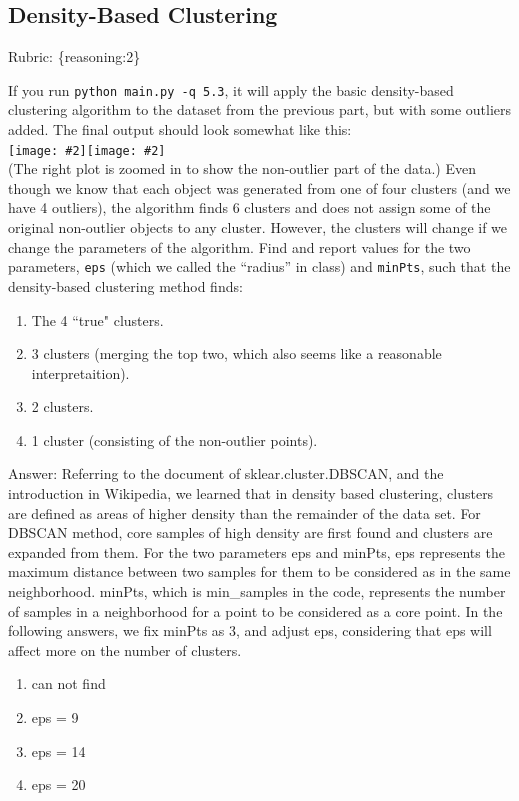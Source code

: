 \documentclass{article}
\def\rubric#1{\gre{Rubric: \{#1\}}}{}
\def\blu#1{{\color{blu}#1}}
\def\gre#1{{\color{gre}#1}}
\newcommand{\fig}[2]{\texttt{[image: \#2]}}
\def\enum#1{\begin{enumerate}#1\end{enumerate}}
\begin{document}
\subsection{Density-Based Clustering}
\rubric{reasoning:2}

If you run \texttt{python main.py -q 5.3},
it will apply the basic density-based clustering algorithm to the dataset from the previous part, but with some outliers added.
The final output should look somewhat like this:\\
\fig{.49}{../figs/density}\fig{.49}{../figs/density2}\\
(The right plot is zoomed in to show the non-outlier part of the data.)
Even though we know that each object was generated from one of four clusters (and we have 4 outliers),
 the algorithm finds 6 clusters and does not assign some of the original non-outlier
  objects to any cluster. However, the clusters will change if we change the parameters
  of the algorithm. Find and report values for the two
  parameters, \texttt{eps} (which we called the ``radius'' in class) and \texttt{minPts},
   such that the density-based clustering method finds:
\blu{\enum{
\item The 4 ``true" clusters.
\item 3 clusters (merging the top two, which also seems like a reasonable interpretaition).
\item 2 clusters.
\item 1 cluster (consisting of the non-outlier points).
}
}
\gre{ Answer:
Referring to the document of sklear.cluster.DBSCAN, and the introduction in Wikipedia, we learned that in density based clustering, clusters are defined as areas of higher density than the remainder of the data set.
For DBSCAN method, core samples of high density are first found and clusters are expanded from them.
For the two parameters eps and minPts, eps represents the maximum distance between two samples for them to be considered as in the same neighborhood.
minPts, which is min\_samples in the code, represents the number of samples in a neighborhood for a point to be considered as a core point.
In the following answers, we fix minPts as 3, and adjust eps, considering that eps will affect more on the number of clusters.
\begin{enumerate}
    \item can not find
    \item eps = 9
    \item eps = 14
    \item eps = 20
\end{enumerate}
}
\end{document}

